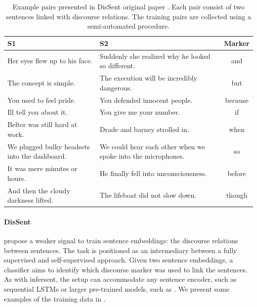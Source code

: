 

\begin{table}[!htb]
\centering
\footnotesize
\begin{tabularx}{16cm}{@{}X X c@{}}
\toprule
\textbf{S1} & \textbf{S2} & \textbf{Marker}\\
\midrule
\midrule 
Her eyes flew up to his face.
&Suddenly she realized why he looked so different.&
and\\[0.4cm]
The concept is simple.
&The execution will be incredibly dangerous.&
but \\[0.2cm]
You used to feel pride.
&You defended innocent people.&
because \\[0.2cm]
Ill tell you about it.
&You give me your number.&
if \\[0.2cm]
Belter was still hard at work.
&Drade and barney strolled in.&
when \\[0.2cm]
We plugged bulky headsets into the dashboard.
&We could hear each other when we spoke into the microphones.&
so \\[0.4cm]
It was mere minutes or hours.
&He finally fell into unconsciousness.&
before \\[0.2cm]
And then the cloudy darkness lifted.
&The lifeboat did not slow down.&
though \\[0.2cm]
\bottomrule
\end{tabularx}
\caption{Example pairs presented in DisSent original paper \textcite{nie_19}. Each pair consist of two sentences linked with discourse relations. The training pairs are collected using a semi-automated procedure.}
\end{table}

\paragraph{DisSent} \textcite{nie_19} propose a weaker signal to train sentence embeddings: the discourse relations between sentences. The task is positioned as an intermediary between a fully supervised and self-supervised approach. Given two sentence embeddings, a classifier aims to identify which discourse marker was used to link the sentences. As with infersent, the setup can accommodate any sentence encoder, such as sequential LSTMs or larger pre-trained models, such as \bert. We present some examples of the training data in .

